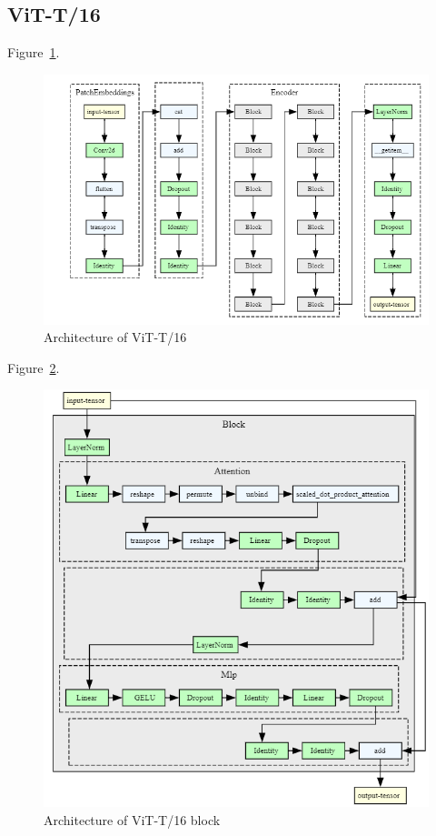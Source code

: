 \subsection{ViT-T/16}
Figure~\ref{fig:vit_t16_architecture}.

\begin{figure}[H]
    \begin{center}
    \includegraphics[width=15cm]{../images/vit_t16_architecture.png}
    \caption{Architecture of ViT-T/16}\label{fig:vit_t16_architecture}
    \end{center}
\end{figure}

Figure~\ref{fig:vit_t16_architecture_block}.

\begin{figure}[H]
    \begin{center}
    \includegraphics[width=15cm]{../images/vit_t16_architecture_block.png}
    \caption{Architecture of ViT-T/16 block}\label{fig:vit_t16_architecture_block}
    \end{center}
\end{figure}





